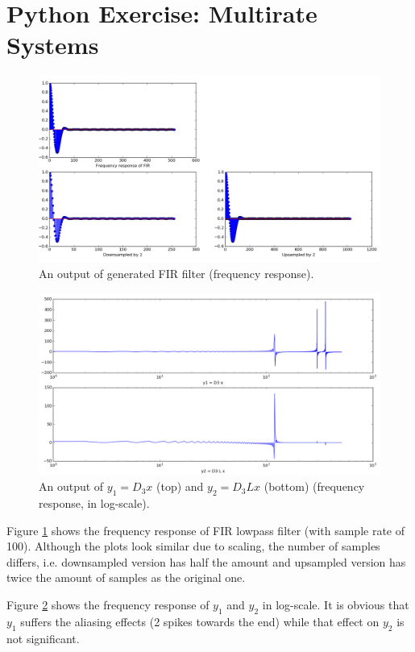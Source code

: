 \section{Python Exercise: Multirate Systems}\label{sec:p9}

\begin{figure}[htbp]
	\centering
	\includegraphics[width=\textwidth]{images/p9-1}
	\caption{An output of generated FIR filter (frequency response).}
	\label{fig:p9-1}
\end{figure}

\begin{figure}[htbp]
	\centering
	\includegraphics[width=\textwidth]{images/p9-2}
	\caption{An output of $y_1 = D_3 x$ (top) and $y_2 = D_3 L x$ (bottom) (frequency response, in log-scale).}
	\label{fig:p9-2}
\end{figure}

Figure \ref{fig:p9-1} shows the frequency response of FIR lowpass filter (with sample rate of 100). Although the plots look similar due to scaling, the number of samples differs, i.e. downsampled version has half the amount and upsampled version has twice the amount of samples as the original one.

Figure \ref{fig:p9-2}  shows the frequency response of $y_1$ and $y_2$ in log-scale. It is obvious that $y_1$ suffers the aliasing effects (2 spikes towards the end) while that effect on $y_2$ is not significant.